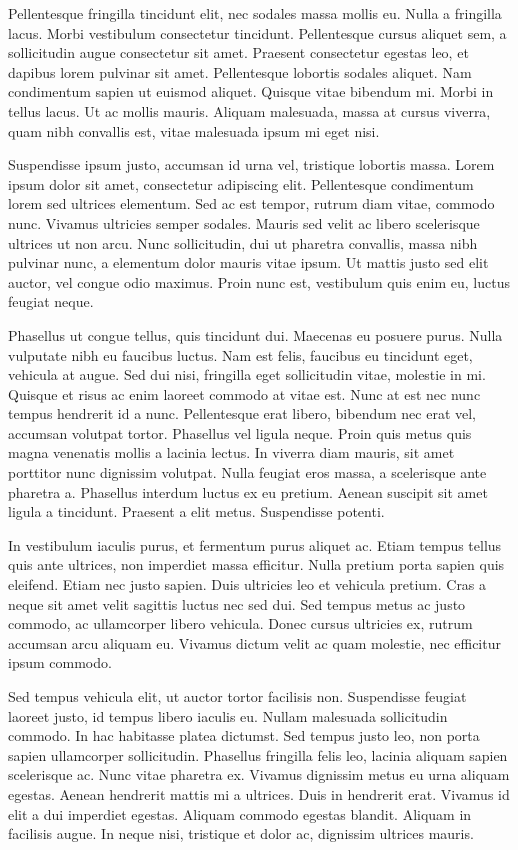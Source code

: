 \documentclass[12pt]{article}
\begin{document}
Pellentesque fringilla tincidunt elit, nec sodales massa mollis eu. Nulla a fringilla lacus. Morbi vestibulum consectetur tincidunt. Pellentesque cursus aliquet sem, a sollicitudin augue consectetur sit amet. Praesent consectetur egestas leo, et dapibus lorem pulvinar sit amet. Pellentesque lobortis sodales aliquet. Nam condimentum sapien ut euismod aliquet. Quisque vitae bibendum mi. Morbi in tellus lacus. Ut ac mollis mauris. Aliquam malesuada, massa at cursus viverra, quam nibh convallis est, vitae malesuada ipsum mi eget nisi.

Suspendisse ipsum justo, accumsan id urna vel, tristique lobortis massa. Lorem ipsum dolor sit amet, consectetur adipiscing elit. Pellentesque condimentum lorem sed ultrices elementum. Sed ac est tempor, rutrum diam vitae, commodo nunc. Vivamus ultricies semper sodales. Mauris sed velit ac libero scelerisque ultrices ut non arcu. Nunc sollicitudin, dui ut pharetra convallis, massa nibh pulvinar nunc, a elementum dolor mauris vitae ipsum. Ut mattis justo sed elit auctor, vel congue odio maximus. Proin nunc est, vestibulum quis enim eu, luctus feugiat neque.

Phasellus ut congue tellus, quis tincidunt dui. Maecenas eu posuere purus. Nulla vulputate nibh eu faucibus luctus. Nam est felis, faucibus eu tincidunt eget, vehicula at augue. Sed dui nisi, fringilla eget sollicitudin vitae, molestie in mi. Quisque et risus ac enim laoreet commodo at vitae est. Nunc at est nec nunc tempus hendrerit id a nunc. Pellentesque erat libero, bibendum nec erat vel, accumsan volutpat tortor. Phasellus vel ligula neque. Proin quis metus quis magna venenatis mollis a lacinia lectus. In viverra diam mauris, sit amet porttitor nunc dignissim volutpat. Nulla feugiat eros massa, a scelerisque ante pharetra a. Phasellus interdum luctus ex eu pretium. Aenean suscipit sit amet ligula a tincidunt. Praesent a elit metus. Suspendisse potenti.

In vestibulum iaculis purus, et fermentum purus aliquet ac. Etiam tempus tellus quis ante ultrices, non imperdiet massa efficitur. Nulla pretium porta sapien quis eleifend. Etiam nec justo sapien. Duis ultricies leo et vehicula pretium. Cras a neque sit amet velit sagittis luctus nec sed dui. Sed tempus metus ac justo commodo, ac ullamcorper libero vehicula. Donec cursus ultricies ex, rutrum accumsan arcu aliquam eu. Vivamus dictum velit ac quam molestie, nec efficitur ipsum commodo.

Sed tempus vehicula elit, ut auctor tortor facilisis non. Suspendisse feugiat laoreet justo, id tempus libero iaculis eu. Nullam malesuada sollicitudin commodo. In hac habitasse platea dictumst. Sed tempus justo leo, non porta sapien ullamcorper sollicitudin. Phasellus fringilla felis leo, lacinia aliquam sapien scelerisque ac. Nunc vitae pharetra ex. Vivamus dignissim metus eu urna aliquam egestas. Aenean hendrerit mattis mi a ultrices. Duis in hendrerit erat. Vivamus id elit a dui imperdiet egestas. Aliquam commodo egestas blandit. Aliquam in facilisis augue. In neque nisi, tristique et dolor ac, dignissim ultrices mauris.
\end{document}

